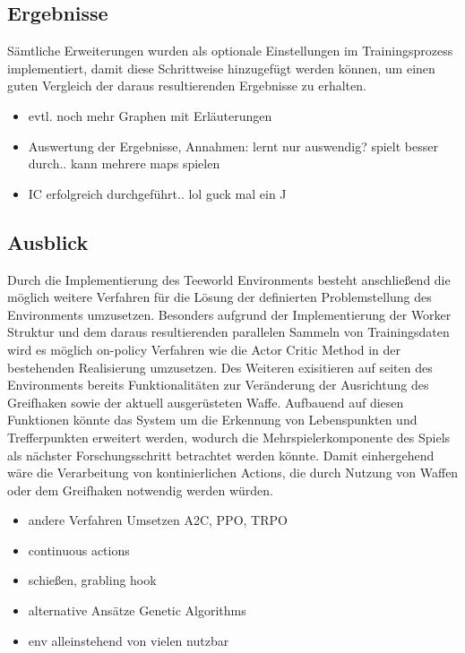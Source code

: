 \documentclass[11pt]{scrartcl}
\begin{document}
\subsection{Ergebnisse} %
Sämtliche Erweiterungen wurden als optionale Einstellungen im Trainingsprozess implementiert,
damit diese Schrittweise hinzugefügt werden können, um einen guten Vergleich der daraus
resultierenden Ergebnisse zu erhalten.
	
\begin{itemize}
\itemsep0pt	
\item evtl. noch mehr Graphen mit Erläuterungen
\item Auswertung der Ergebnisse, Annahmen: lernt nur auswendig? spielt besser durch.. kann mehrere maps spielen
\item IC erfolgreich durchgeführt.. lol guck mal ein ^^
\end{itemize}

\subsection{Ausblick} %
Durch die Implementierung des Teeworld Environments besteht anschließend die möglich weitere Verfahren
für die Lösung der definierten Problemstellung des Environments umzusetzen. Besonders aufgrund der
Implementierung der Worker Struktur und dem daraus resultierenden parallelen Sammeln von Trainingsdaten
wird es möglich on-policy Verfahren wie die Actor Critic Method in der bestehenden Realisierung umzusetzen.
Des Weiteren exisitieren auf seiten des Environments bereits Funktionalitäten zur Veränderung der
Ausrichtung des Greifhaken sowie der aktuell ausgerüsteten Waffe. Aufbauend auf diesen Funktionen könnte
das System um die Erkennung von Lebenspunkten und Trefferpunkten erweitert werden, wodurch die
Mehrspielerkomponente des Spiels als nächster Forschungsschritt betrachtet werden könnte. Damit
einhergehend wäre die Verarbeitung von kontinierlichen Actions, die durch Nutzung von Waffen oder dem
Greifhaken notwendig werden würden.

\begin{itemize}
\itemsep0pt	
\item andere Verfahren Umsetzen A2C, PPO, TRPO
\item continuous actions
\item schießen, grabling hook
\item alternative Ansätze Genetic Algorithms
\item env alleinstehend von vielen nutzbar
\end{itemize}
\end{document}
